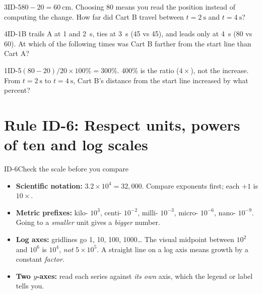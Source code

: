 \documentclass[11pt]{article}
\begin{document}
\begin{q}{3}{ID-5}{$80-20=\SI{60}{\centi\metre}$. Choosing 80 means you read the position instead of computing the change.}
How far did Cart B travel between $t=\SI{2}{\second}$ and $t=\SI{4}{\second}$?
\end{q}

\begin{q}{4}{ID-1}{B trails A at 1 and \SI{2}{\second}, ties at \SI{3}{\second} (45 vs 45), and leads only at \SI{4}{\second} (80 vs 60).}
At which of the following times was Cart B farther from the start line than Cart A?
\end{q}

\begin{q}{1}{ID-5}{$(80-20)/20\times100\% = 300\%$. 400\% is the ratio ($4\times$), not the increase.}
From $t=\SI{2}{\second}$ to $t=\SI{4}{\second}$, Cart B's distance from the start line increased by what percent?
\end{q}

\section{Rule ID-6: Respect units, powers of ten and log scales}

\begin{rulebox}{ID-6}{Check the scale before you compare}
\begin{itemize}
\item \textbf{Scientific notation:} $3.2\times10^{4} = 32{,}000$. Compare exponents first; each $+1$ is $10\times$.
\item \textbf{Metric prefixes:} kilo- $10^{3}$, centi- $10^{-2}$, milli- $10^{-3}$, micro- $10^{-6}$, nano- $10^{-9}$. Going to a \emph{smaller} unit gives a \emph{bigger} number.
\item \textbf{Log axes:} gridlines go 1, 10, 100, 1000\ldots{} The visual midpoint between $10^{2}$ and $10^{6}$ is $10^{4}$, \emph{not} $5\times10^{5}$. A straight line on a log axis means growth by a constant \emph{factor}.
\item \textbf{Two $y$-axes:} read each series against \emph{its own} axis, which the legend or label tells you.
\end{itemize}
\end{rulebox}
\end{document}
